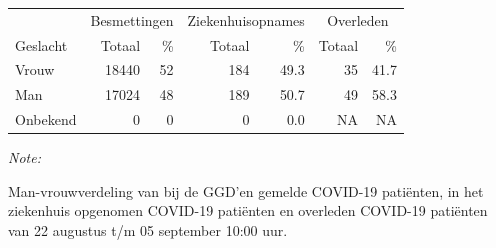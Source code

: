 \documentclass[
  english,
  man,floatsintext]{apa6}
\begin{document}
\begin{table}
\centering\begingroup\fontsize{11}{13}\selectfont

\begin{threeparttable}
\begin{tabular}{lrrrrrr}
\toprule
\multicolumn{1}{c}{ } & \multicolumn{2}{c}{Besmettingen} & \multicolumn{2}{c}{Ziekenhuisopnames} & \multicolumn{2}{c}{Overleden} \\
\cmidrule(l{3pt}r{3pt}){2-3} \cmidrule(l{3pt}r{3pt}){4-5} \cmidrule(l{3pt}r{3pt}){6-7}
Geslacht & Totaal & \% & Totaal & \% & Totaal & \%\\
\midrule
Vrouw & 18440 & 52 & 184 & 49.3 & 35 & 41.7\\
Man & 17024 & 48 & 189 & 50.7 & 49 & 58.3\\
Onbekend & 0 & 0 & 0 & 0.0 & NA & NA\\
\bottomrule
\end{tabular}
\begin{tablenotes}
\item \textit{Note: } 
\item Man-vrouwverdeling van bij de GGD’en gemelde COVID-19 patiënten, in het ziekenhuis opgenomen COVID-19 patiënten en overleden COVID-19 patiënten van 22 augustus t/m 05 september 10:00 uur.
\end{tablenotes}
\end{threeparttable}
\endgroup{}
\end{table}
\newpage
\end{document}
